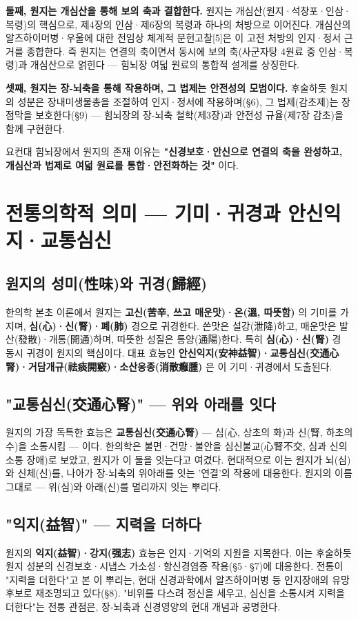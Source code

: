 \documentclass[11pt,oneside]{book}
\begin{document}
\textbf{둘째, 원지는 개심산을 통해 보의 축과 결합한다.} 원지는 개심산(원지·석창포·인삼·복령)의 핵심으로, 제4장의 인삼·제6장의 복령과 하나의 처방으로 이어진다. 개심산의 알츠하이머병·우울에 대한 전임상 체계적 문헌고찰[5]은 이 고전 처방의 인지·정서 근거를 종합한다. 즉 원지는 연결의 축이면서 동시에 보의 축(사군자탕 4원료 중 인삼·복령)과 개심산으로 얽힌다 — 힘뇌장 여덟 원료의 통합적 설계를 상징한다.

\textbf{셋째, 원지는 장-뇌축을 통해 작용하며, 그 법제는 안전성의 모범이다.} 후술하듯 원지의 성분은 장내미생물총을 조절하여 인지·정서에 작용하며(§6), 그 법제(감초제)는 장 점막을 보호한다(§9) — 힘뇌장의 장-뇌축 철학(제3장)과 안전성 규율(제7장 감초)을 함께 구현한다.

요컨대 힘뇌장에서 원지의 존재 이유는 \textbf{"신경보호·안신으로 연결의 축을 완성하고, 개심산과 법제로 여덟 원료를 통합·안전화하는 것"} 이다.

\section{전통의학적 의미 — 기미·귀경과 안신익지·교통심신}
\subsection{원지의 성미(性味)와 귀경(歸經)}
한의학 본초 이론에서 원지는 \textbf{고신(苦辛, 쓰고 매운맛)·온(溫, 따뜻함)} 의 기미를 가지며, \textbf{심(心)·신(腎)·폐(肺)} 경으로 귀경한다. 쓴맛은 설강(泄降)하고, 매운맛은 발산(發散)·개통(開通)하며, 따뜻한 성질은 통양(通陽)한다. 특히 \textbf{심(心)·신(腎)} 경 동시 귀경이 원지의 핵심이다. 대표 효능인 \textbf{안신익지(安神益智)·교통심신(交通心腎)·거담개규(祛痰開竅)·소산옹종(消散癰腫)} 은 이 기미·귀경에서 도출된다.

\subsection{"교통심신(交通心腎)" — 위와 아래를 잇다}
원지의 가장 독특한 효능은 \textbf{교통심신(交通心腎)} — 심(心, 상초의 화)과 신(腎, 하초의 수)을 소통시킴 — 이다. 한의학은 불면·건망·불안을 심신불교(心腎不交, 심과 신의 소통 장애)로 보았고, 원지가 이 둘을 잇는다고 여겼다. 현대적으로 이는 원지가 뇌(심)와 신체(신)를, 나아가 장-뇌축의 위아래를 잇는 '연결'의 작용에 대응한다. 원지의 이름 그대로 — 위(심)와 아래(신)를 멀리까지 잇는 뿌리다.

\subsection{"익지(益智)" — 지력을 더하다}
원지의 \textbf{익지(益智)·강지(强志)} 효능은 인지·기억의 지원을 지목한다. 이는 후술하듯 원지 성분의 신경보호·시냅스 가소성·항신경염증 작용(§5·§7)에 대응한다. 전통이 "지력을 더한다"고 본 이 뿌리는, 현대 신경과학에서 알츠하이머병 등 인지장애의 유망 후보로 재조명되고 있다(§8). "비위를 다스려 정신을 세우고, 심신을 소통시켜 지력을 더한다"는 전통 관점은, 장-뇌축과 신경영양의 현대 개념과 공명한다.
\end{document}
